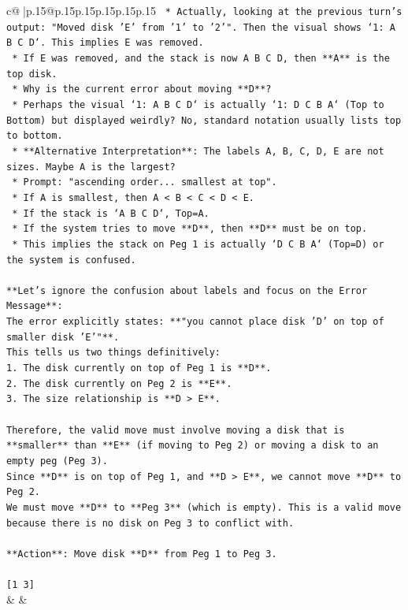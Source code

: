 \documentclass{article}
\begin{document}
{\begin{supertabular}{c@{$\;$}|p{.15\linewidth}@{}p{.15\linewidth}p{.15\linewidth}p{.15\linewidth}p{.15\linewidth}p{.15\linewidth}}
{{{\texttt{    *   Actually, looking at the previous turn's output: "Moved disk 'E' from '1' to '2'". Then the visual shows `1: A B C D`. This implies E was removed.} \\
\texttt{    *   If E was removed, and the stack is now A B C D, then **A** is the top disk.} \\
\texttt{    *   Why is the current error about moving **D**?} \\
\texttt{    *   Perhaps the visual `1: A B C D` is actually `1: D C B A` (Top to Bottom) but displayed weirdly? No, standard notation usually lists top to bottom.} \\
\texttt{    *   **Alternative Interpretation**: The labels A, B, C, D, E are not sizes. Maybe A is the largest?} \\
\texttt{        *   Prompt: "ascending order... smallest at top".} \\
\texttt{        *   If A is smallest, then A < B < C < D < E.} \\
\texttt{        *   If the stack is `A B C D`, Top=A.} \\
\texttt{        *   If the system tries to move **D**, then **D** must be on top.} \\
\texttt{        *   This implies the stack on Peg 1 is actually `D C B A` (Top=D) or the system is confused.} \\
\\ 
\texttt{**Let's ignore the confusion about labels and focus on the Error Message**:} \\
\texttt{The error explicitly states: **"you cannot place disk 'D' on top of smaller disk 'E'"**.} \\
\texttt{This tells us two things definitively:} \\
\texttt{1.  The disk currently on top of Peg 1 is **D**.} \\
\texttt{2.  The disk currently on Peg 2 is **E**.} \\
\texttt{3.  The size relationship is **D > E**.} \\
\\ 
\texttt{Therefore, the valid move must involve moving a disk that is **smaller** than **E** (if moving to Peg 2) or moving a disk to an empty peg (Peg 3).} \\
\texttt{Since **D** is on top of Peg 1, and **D > E**, we cannot move **D** to Peg 2.} \\
\texttt{We must move **D** to **Peg 3** (which is empty). This is a valid move because there is no disk on Peg 3 to conflict with.} \\
\\ 
\texttt{**Action**: Move disk **D** from Peg 1 to Peg 3.} \\
\\ 
\texttt{{[}1 3{]}} \\
            }
        }
    }
    & & \\ \\


\end{supertabular}}
\end{document}
